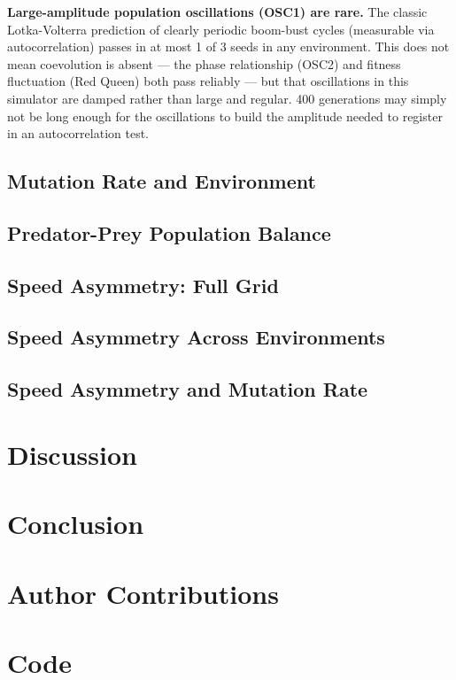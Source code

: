 \documentclass[11pt]{article}
\begin{document}
\textbf{Large-amplitude population oscillations (OSC1) are rare.}
The classic Lotka-Volterra prediction of clearly periodic boom-bust cycles (measurable via
autocorrelation) passes in at most 1 of 3 seeds in any environment.
This does not mean coevolution is absent — the phase relationship (OSC2) and fitness
fluctuation (Red Queen) both pass reliably — but that oscillations in this simulator are
damped rather than large and regular.
400 generations may simply not be long enough for the oscillations to build the amplitude
needed to register in an autocorrelation test.

\subsection{Mutation Rate and Environment}              %
\subsection{Predator-Prey Population Balance}           %
\subsection{Speed Asymmetry: Full Grid}                 %
\subsection{Speed Asymmetry Across Environments}        %
\subsection{Speed Asymmetry and Mutation Rate}          %

\section{Discussion}

\section{Conclusion}

\section{Author Contributions}

\section{Code}
\end{document}
